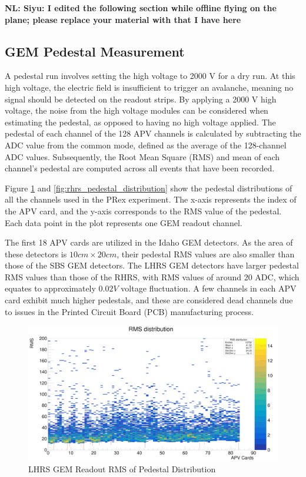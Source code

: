 {\bf NL: Siyu:  I edited the following section while offline flying on the plane; please replace your material with that I have here }


\subsection{GEM Pedestal Measurement}

A pedestal run involves setting the high voltage to 2000 V for a dry run. At this high voltage, the electric field is insufficient to trigger an avalanche, meaning no signal should be detected on the readout strips. By applying a 2000 V high voltage, the noise from the high voltage modules can be considered when estimating the pedestal, as opposed to having no high voltage applied. The pedestal of each channel of the 128 APV channels is calculated by subtracting the ADC value from the common mode, defined as the average of the 128-channel ADC values. Subsequently, the Root Mean Square (RMS) and mean of each channel's pedestal are computed across all  events that have been recorded.

Figure \ref{fig:lhrs_pedestal_distribution} and \ref{fig:rhrs_pedestal_distribution} show the pedestal distributions of all the channels used in the PRex experiment. The x-axis represents the index of the APV card, and the y-axis corresponds to the RMS value of the pedestal. Each data point in the plot represents one GEM readout channel.

The first 18 APV cards are utilized in the Idaho GEM detectors. As the area of these detectors is $10 cm \times 20 cm$, their pedestal RMS values are also smaller than those of the SBS GEM detectors. The LHRS GEM detectors have larger pedestal RMS values than those of the RHRS, with RMS values of around 20 ADC, which equates to approximately $0.02 V$ voltage fluctuation. A few channels in each APV card exhibit much higher pedestals, and these are considered dead channels due to issues in the Printed Circuit Board (PCB) manufacturing process.

\begin{figure}[!htbp]
    \centering
    \includegraphics[width=\textwidth]{images/chap5/LHRS_pedestal.png}
    \caption{LHRS GEM Readout RMS of Pedestal Distribution}
    \label{fig:lhrs_pedestal_distribution}
\end{figure}

